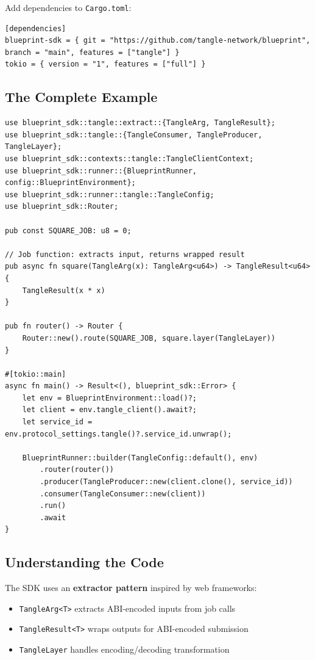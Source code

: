 \documentclass[11pt,a4paper]{article}
\begin{document}
Add dependencies to \texttt{Cargo.toml}:
\begin{lstlisting}
[dependencies]
blueprint-sdk = { git = "https://github.com/tangle-network/blueprint", branch = "main", features = ["tangle"] }
tokio = { version = "1", features = ["full"] }
\end{lstlisting}

\subsection{The Complete Example}

\begin{lstlisting}
use blueprint_sdk::tangle::extract::{TangleArg, TangleResult};
use blueprint_sdk::tangle::{TangleConsumer, TangleProducer, TangleLayer};
use blueprint_sdk::contexts::tangle::TangleClientContext;
use blueprint_sdk::runner::{BlueprintRunner, config::BlueprintEnvironment};
use blueprint_sdk::runner::tangle::TangleConfig;
use blueprint_sdk::Router;

pub const SQUARE_JOB: u8 = 0;

// Job function: extracts input, returns wrapped result
pub async fn square(TangleArg(x): TangleArg<u64>) -> TangleResult<u64> {
    TangleResult(x * x)
}

pub fn router() -> Router {
    Router::new().route(SQUARE_JOB, square.layer(TangleLayer))
}

#[tokio::main]
async fn main() -> Result<(), blueprint_sdk::Error> {
    let env = BlueprintEnvironment::load()?;
    let client = env.tangle_client().await?;
    let service_id = env.protocol_settings.tangle()?.service_id.unwrap();

    BlueprintRunner::builder(TangleConfig::default(), env)
        .router(router())
        .producer(TangleProducer::new(client.clone(), service_id))
        .consumer(TangleConsumer::new(client))
        .run()
        .await
}
\end{lstlisting}

\subsection{Understanding the Code}

The SDK uses an \textbf{extractor pattern} inspired by web frameworks:
\begin{itemize}[noitemsep]
    \item \texttt{TangleArg<T>} extracts ABI-encoded inputs from job calls
    \item \texttt{TangleResult<T>} wraps outputs for ABI-encoded submission
    \item \texttt{TangleLayer} handles encoding/decoding transformation
\end{itemize}
\end{document}
